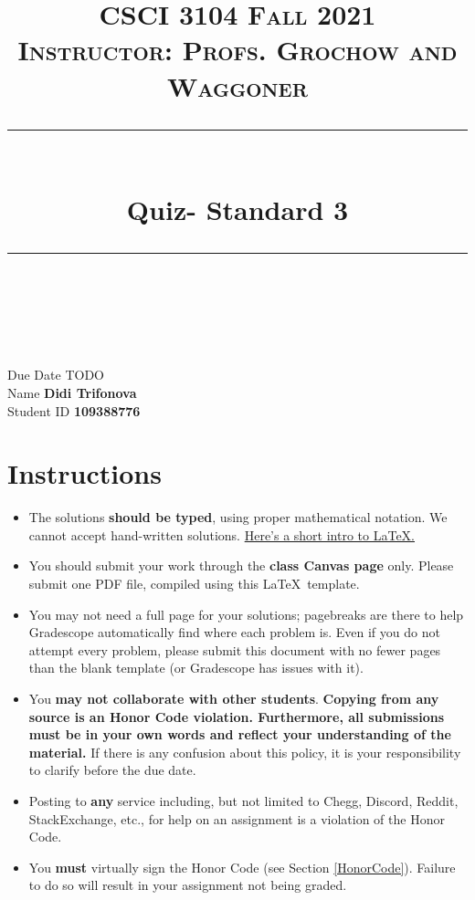 \documentclass[11pt]{article}
\title{
\normalfont \normalsize 
\textsc{CSCI 3104 Fall 2021 \\ 
Instructor: Profs. Grochow and Waggoner} \\
[10pt] 
\rule{\linewidth}{0.5pt} \\[6pt] 
\huge Quiz- Standard 3 \\
\rule{\linewidth}{2pt}  \\[10pt]
}
\date{}
\theoremstyle{definition}
\theoremstyle{definition}
\theoremstyle{definition}
\begin{document}
\maketitle


\noindent
Due Date \dotfill TODO \\
Name \dotfill \textbf{Didi Trifonova} \\
Student ID \dotfill \textbf{109388776} \\


\tableofcontents

\section{Instructions}
 \begin{itemize}
	\item The solutions \textbf{should be typed}, using proper mathematical notation. We cannot accept hand-written solutions. \href{http://ece.uprm.edu/~caceros/latex/introduction.pdf}{Here's a short intro to \LaTeX.}
	\item You should submit your work through the \textbf{class Canvas page} only. Please submit one PDF file, compiled using this \LaTeX \ template.
	\item You may not need a full page for your solutions; pagebreaks are there to help Gradescope automatically find where each problem is. Even if you do not attempt every problem, please submit this document with no fewer pages than the blank template (or Gradescope has issues with it).

	\item You \textbf{may not collaborate with other students}. \textbf{Copying from any source is an Honor Code violation. Furthermore, all submissions must be in your own words and reflect your understanding of the material.} If there is any confusion about this policy, it is your responsibility to clarify before the due date. 

	\item Posting to \textbf{any} service including, but not limited to Chegg, Discord, Reddit, StackExchange, etc., for help on an assignment is a violation of the Honor Code.

	\item You \textbf{must} virtually sign the Honor Code (see Section \ref{HonorCode}). Failure to do so will result in your assignment not being graded.
\end{itemize}
\end{document}
